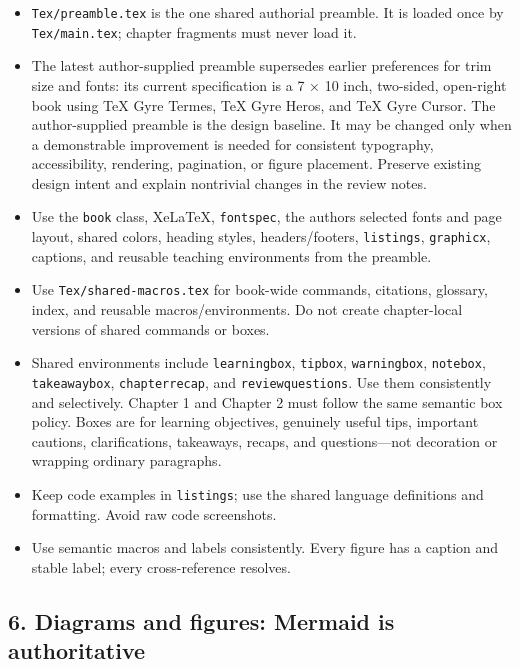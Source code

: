 \begin{itemize}
\tightlist
\item
  \texttt{Tex/preamble.tex} is the one shared authorial preamble. It is
  loaded once by \texttt{Tex/main.tex}; chapter fragments must never
  load it.
\item
  The latest author-supplied preamble supersedes earlier preferences for
  trim size and fonts: its current specification is a 7 × 10 inch,
  two-sided, open-right book using TeX Gyre Termes, TeX Gyre Heros, and
  TeX Gyre Cursor. The author-supplied preamble is the design baseline.
  It may be changed only when a demonstrable improvement is needed for
  consistent typography, accessibility, rendering, pagination, or figure
  placement. Preserve existing design intent and explain nontrivial
  changes in the review notes.
\item
  Use the \texttt{book} class, XeLaTeX, \texttt{fontspec}, the
  author\textquotesingle s selected fonts and page layout, shared
  colors, heading styles, headers/footers, \texttt{listings},
  \texttt{graphicx}, captions, and reusable teaching environments from
  the preamble.
\item
  Use \texttt{Tex/shared-macros.tex} for book-wide commands, citations,
  glossary, index, and reusable macros/environments. Do not create
  chapter-local versions of shared commands or boxes.
\item
  Shared environments include \texttt{learningbox}, \texttt{tipbox},
  \texttt{warningbox}, \texttt{notebox}, \texttt{takeawaybox},
  \texttt{chapterrecap}, and \texttt{reviewquestions}. Use them
  consistently and selectively. Chapter 1 and Chapter 2 must follow the
  same semantic box policy. Boxes are for learning objectives, genuinely
  useful tips, important cautions, clarifications, takeaways, recaps,
  and questions---not decoration or wrapping ordinary paragraphs.
\item
  Keep code examples in \texttt{listings}; use the shared language
  definitions and formatting. Avoid raw code screenshots.
\item
  Use semantic macros and labels consistently. Every figure has a
  caption and stable label; every cross-reference resolves.
\end{itemize}

\subsection{6. Diagrams and figures: Mermaid is
authoritative}\label{6-diagrams-and-figures-mermaid-is-authoritative}

